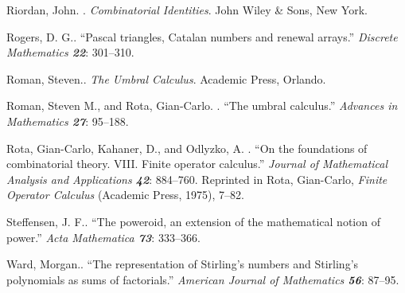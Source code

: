 \bib
Riordan, John. . \bibspace
 {\sl Combinatorial Identities}. John Wiley \&
Sons, New York.

\bib
Rogers, D. G..\bibspace
``Pascal triangles, Catalan numbers and renewal arrays.'' {\sl
Discrete Mathematics\/ \bf 22}: 301--310.

\bib
Roman, Steven..\bibspace
{\sl The Umbral Calculus}. Academic Press, Orlando.

\bib
Roman, Steven M., and Rota, Gian-Carlo. . \bibspace
``The umbral calculus.'' {\sl Advances in Mathematics\/ \bf 27}:
95--188.

\bib
Rota, Gian-Carlo, Kahaner, D., and Odlyzko, A. . \bibspace
``On the foundations of combinatorial theory. VIII. Finite operator
calculus.'' {\sl Journal of Mathematical Analysis and Applications\/ \bf
42}: 884--760. Reprinted in Rota, Gian-Carlo, {\sl Finite Operator
Calculus\/} (Academic Press, 1975), 7--82.

\bib
Steffensen, J. F..\bibspace
``The poweroid, an extension of the mathematical notion of power.''
{\sl Acta Mathematica\/ \bf 73}: 333--366.


\bib
Ward, Morgan..\bibspace
``The representation of Stirling's numbers and Stirling's polynomials
as sums of factorials.'' {\sl American Journal of Mathematics\/ \bf
56}: 87--95.


\bye



